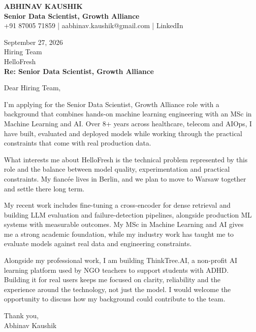 \documentclass[10pt,a4paper]{article}
\begin{document}
\begin{center}
{\Large\bfseries ABHINAV KAUSHIK}\\[2pt]
{\bfseries Senior Data Scientist, Growth Alliance}\\[2pt]
+91 87005 71859 \quad | \quad aabhinav.kaushik@gmail.com \quad | \quad LinkedIn
\end{center}
\vspace{8pt}
September 27, 2026\\[6pt]
Hiring Team\\
HelloFresh\\[4pt]
\textbf{Re: Senior Data Scientist, Growth Alliance}

Dear Hiring Team,

I’m applying for the Senior Data Scientist, Growth Alliance role with a background that combines hands-on machine learning engineering with an MSc in Machine Learning and AI. Over 8+ years across healthcare, telecom and AIOps, I have built, evaluated and deployed models while working through the practical constraints that come with real production data.

What interests me about HelloFresh is the technical problem represented by this role and the balance between model quality, experimentation and practical constraints. My fiancée lives in Berlin, and we plan to move to Warsaw together and settle there long term.

My recent work includes fine-tuning a cross-encoder for dense retrieval and building LLM evaluation and failure-detection pipelines, alongside production ML systems with measurable outcomes. My MSc in Machine Learning and AI gives me a strong academic foundation, while my industry work has taught me to evaluate models against real data and engineering constraints.

Alongside my professional work, I am building ThinkTree.AI, a non-profit AI learning platform used by NGO teachers to support students with ADHD. Building it for real users keeps me focused on clarity, reliability and the experience around the technology, not just the model. I would welcome the opportunity to discuss how my background could contribute to the team.

Thank you,\\
Abhinav Kaushik
\end{document}
